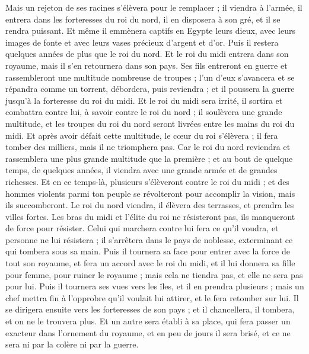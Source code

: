 \begin{multicols}{2}
Mais un rejeton de ses racines s'élèvera pour le remplacer ; il viendra à l'armée, il entrera dans les forteresses du roi du nord, il en disposera à son gré, et il se rendra puissant.
Et même il emmènera captifs en Egypte leurs dieux, avec leurs images de fonte et avec leurs vases précieux d'argent et d'or. Puis il restera quelques années de plus que le roi du nord.
Et le roi du midi entrera dans son royaume, mais il s'en retournera dans son pays.
Ses fils entreront en guerre et rassembleront une multitude nombreuse de troupes ; l'un d'eux s'avancera et se répandra comme un torrent, débordera, puis reviendra ; et il poussera la guerre jusqu'à la forteresse du roi du midi.
Et le roi du midi sera irrité, il sortira et combattra contre lui, à savoir contre le roi du nord ; il soulèvera une grande multitude, et les troupes du roi du nord seront livrées entre les mains du roi du midi.
Et après avoir défait cette multitude, le cœur du roi s'élèvera ; il fera tomber des milliers, mais il ne triomphera pas.
Car le roi du nord reviendra et rassemblera une plus grande multitude que la première ; et au bout de quelque temps, de quelques années, il viendra avec une grande armée et de grandes richesses.
Et en ce temps-là, plusieurs s'élèveront contre le roi du midi ; et des hommes violents parmi ton peuple se révolteront pour accomplir la vision, mais ils succomberont.
Le roi du nord viendra, il élèvera des terrasses, et prendra les villes fortes. Les bras du midi et l'élite du roi ne résisteront pas, ils manqueront de force pour résister.
Celui qui marchera contre lui fera ce qu'il voudra, et personne ne lui résistera ; il s'arrêtera dans le pays de noblesse, exterminant ce qui tombera sous sa main.
Puis il tournera sa face pour entrer avec la force de tout son royaume, et fera un accord avec le roi du midi, et il lui donnera sa fille pour femme, pour ruiner le royaume ; mais cela ne tiendra pas, et elle ne sera pas pour lui. 
Puis il tournera ses vues vers les îles, et il en prendra plusieurs ; mais un chef mettra fin à l'opprobre qu'il voulait lui attirer, et le fera retomber sur lui.
Il se dirigera ensuite vers les forteresses de son pays ; et il chancellera, il tombera, et on ne le trouvera plus.
Et un autre sera établi à sa place, qui fera passer un exacteur dans l'ornement du royaume, et en peu de jours il sera brisé, et ce ne sera ni par la colère ni par la guerre.

\end{multicols}
